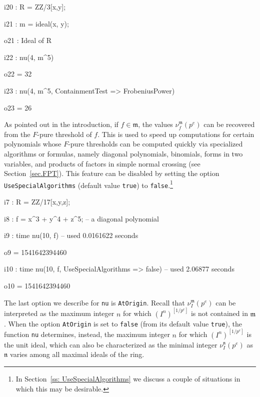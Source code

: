 \documentclass{amsart}
\newcommand{\idealm}{\mathfrak{m}}
\begin{document}
\smallskip
{\small
{}
\begin{MyVerbatim}
i20 : R = ZZ/3[x,y];

i21 : m = ideal(x, y);

o21 : Ideal of R

i22 : nu(4, m^5)

o22 = 32

i23 : nu(4, m^5, ContainmentTest => FrobeniusPower)

o23 = 26
\end{MyVerbatim}
}
\smallskip


As pointed out in the introduction, if $f \in \mathfrak{m}$, the values $\nu^{\mathfrak{m}}_f(p^e)$ can be recovered from the $F$-pure threshold of $f$.
This is used to speed up computations for certain polynomials whose $F$-pure thresholds can be computed quickly via specialized algorithms or formulas, namely diagonal polynomials, binomials, forms in two variables, and products of factors in simple normal crossing (see Section~\ref{sec.FPT}).
This feature can be disabled by setting the option \texttt{UseSpecialAlgorithms} (default value \texttt{true}) to \texttt{false}.\footnote{In Section~\ref{ss: UseSpecialAlgorithms} we discuss a couple of situations in which this may be desirable.}

\smallskip
{\small
{}
\begin{MyVerbatim}
i7 : R = ZZ/17[x,y,z];

i8 : f = x^3 + y^4 + z^5; -- a diagonal polynomial

i9 : time nu(10, f)
     -- used 0.0161622 seconds

o9 = 1541642394460

i10 : time nu(10, f, UseSpecialAlgorithms => false)
     -- used 2.06877 seconds

o10 = 1541642394460
\end{MyVerbatim}
}
\smallskip



The last option we describe for \texttt{nu} is \texttt{AtOrigin}.
Recall that $\nu_I^\idealm(p^e)$ can be interpreted as the maximum integer $n$ for which $(I^n)^{[1/p^e]}$ is not contained in $\idealm$. 
When the option \texttt{AtOrigin} is set to \texttt{false} (from its default value \texttt{true}), the function \texttt{nu} determines, instead, the maximum integer $n$ for which $(I^n)^{[1/p^e]}$ is the unit ideal, which can also be characterized as the minimal integer $\nu_I^\mathfrak{n}(p^e)$ as $\mathfrak{n}$ varies among all maximal ideals of the ring.  
\end{document}
